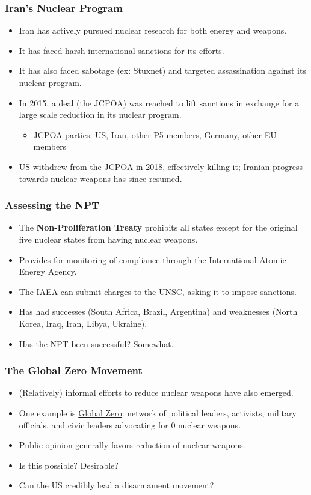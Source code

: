 \documentclass[handout]{beamer}
\begin{document}
\begin{frame} 
\frametitle{\LARGE{Iran's Nuclear Program}}
\begin{itemize}
		\item Iran has actively pursued nuclear research for both energy and weapons. \pause
		\item It has faced harsh international sanctions for its efforts. \pause
		\item It has also faced sabotage (ex: Stuxnet) and targeted assassination against its nuclear program. 
		\item In 2015, a deal (the JCPOA) was reached to lift sanctions in exchange for a large scale reduction in its nuclear program. \pause
		\begin{itemize}
			\item JCPOA parties: US, Iran, other P5 members, Germany, other EU members \pause
		\end{itemize}
		\item US withdrew from the JCPOA in 2018, effectively killing it; Iranian progress towards nuclear weapons has since resumed.
\end{itemize}
\end{frame}

\begin{frame} 
\frametitle{\LARGE{Assessing the NPT}}
\begin{itemize}
		\item The \textbf{Non-Proliferation Treaty} prohibits all states except for the original five nuclear states from having nuclear weapons. \pause
		\item Provides for monitoring of compliance through the International Atomic Energy Agency. \pause 
		\item The IAEA can submit charges to the UNSC, asking it to impose sanctions. \pause
		\item Has had successes (South Africa, Brazil, Argentina) and weaknesses (North Korea, Iraq, Iran, Libya, Ukraine). \pause
		\item Has the NPT been successful? Somewhat.
\end{itemize}
\end{frame}



\begin{frame} 
\frametitle{\LARGE{The Global Zero Movement}}
\begin{itemize}
		\item (Relatively) informal efforts to reduce nuclear weapons have also emerged. \pause \item One example is \href{https://www.globalzero.org/}{Global Zero}: network of political leaders, activists, military officials, and civic leaders advocating for 0 nuclear weapons. \pause
		\item Public opinion generally favors reduction of nuclear weapons. \pause 
		\item Is this possible? Desirable? \pause 
		\item Can the US credibly lead a disarmament movement? 
\end{itemize}
\end{frame}
\end{document}
